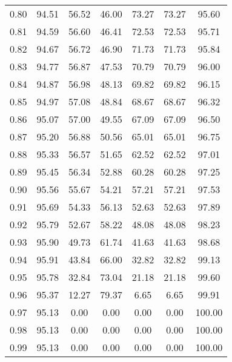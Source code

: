 \begin{tabular}{|c|c|c|c|c|c|c|}
      0.80 &     94.51 &     56.52 &      46.00 &   73.27 &      73.27 &         95.60 \\
      0.81 &     94.59 &     56.60 &      46.41 &   72.53 &      72.53 &         95.71 \\
      0.82 &     94.67 &     56.72 &      46.90 &   71.73 &      71.73 &         95.84 \\
      0.83 &     94.77 &     56.87 &      47.53 &   70.79 &      70.79 &         96.00 \\
      0.84 &     94.87 &     56.98 &      48.13 &   69.82 &      69.82 &         96.15 \\
      0.85 &     94.97 &     57.08 &      48.84 &   68.67 &      68.67 &         96.32 \\
      0.86 &     95.07 &     57.00 &      49.55 &   67.09 &      67.09 &         96.50 \\
      0.87 &     95.20 &     56.88 &      50.56 &   65.01 &      65.01 &         96.75 \\
      0.88 &     95.33 &     56.57 &      51.65 &   62.52 &      62.52 &         97.01 \\
      0.89 &     95.45 &     56.34 &      52.88 &   60.28 &      60.28 &         97.25 \\
      0.90 &     95.56 &     55.67 &      54.21 &   57.21 &      57.21 &         97.53 \\
      0.91 &     95.69 &     54.33 &      56.13 &   52.63 &      52.63 &         97.89 \\
      0.92 &     95.79 &     52.67 &      58.22 &   48.08 &      48.08 &         98.23 \\
      0.93 &     95.90 &     49.73 &      61.74 &   41.63 &      41.63 &         98.68 \\
      0.94 &     95.91 &     43.84 &      66.00 &   32.82 &      32.82 &         99.13 \\
      0.95 &     95.78 &     32.84 &      73.04 &   21.18 &      21.18 &         99.60 \\
      0.96 &     95.37 &     12.27 &      79.37 &    6.65 &       6.65 &         99.91 \\
      0.97 &     95.13 &      0.00 &       0.00 &    0.00 &       0.00 &        100.00 \\
      0.98 &     95.13 &      0.00 &       0.00 &    0.00 &       0.00 &        100.00 \\
      0.99 &     95.13 &      0.00 &       0.00 &    0.00 &       0.00 &        100.00 \\
\bottomrule
\end{tabular}
